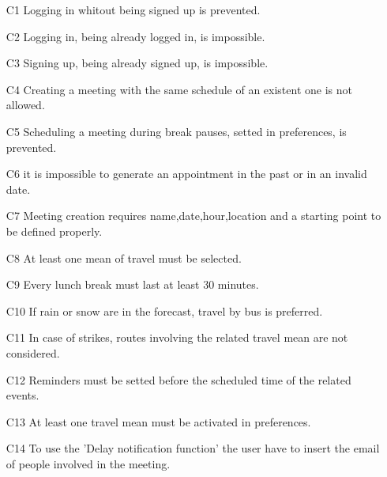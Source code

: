 \begin{itemize}
		\item [\hypertarget{C1}{C1}] Logging in whitout being signed up is prevented. 
		\item [\hypertarget{C2}{C2}] Logging in, being already logged in, is impossible. 
		\item [\hypertarget{C3}{C3}] Signing up, being already signed up, is impossible.
		\item [\hypertarget{C4}{C4}] Creating a meeting with the same schedule of an existent one is not allowed. 
		\item [\hypertarget{C5}{C5}] Scheduling a meeting during break pauses, setted in preferences, is prevented. 
		\item [\hypertarget{C6}{C6}] it is impossible to generate an appointment in the past or in an invalid date. 
		\item [\hypertarget{C7}{C7}] Meeting creation requires name,date,hour,location and a starting point to be defined properly.
		\item [\hypertarget{C8}{C8}] At least one mean of travel must be selected.
		\item [\hypertarget{C9}{C9}] Every lunch break must last at least 30 minutes.
		\item [\hypertarget{C10}{C10}] If rain or snow are in the forecast, travel by bus is preferred. 
		\item [\hypertarget{C11}{C11}] In case of strikes, routes involving the related travel mean are not considered. 
		\item [\hypertarget{C12}{C12}] Reminders must be setted before the scheduled time of the related events.
		\item [\hypertarget{C13}{C13}] At least one travel mean must be activated in preferences.
		\item [\hypertarget{C14}{C14}] To use the 'Delay notification function' the user have to insert the email of people involved in the meeting.
	\end{itemize}
